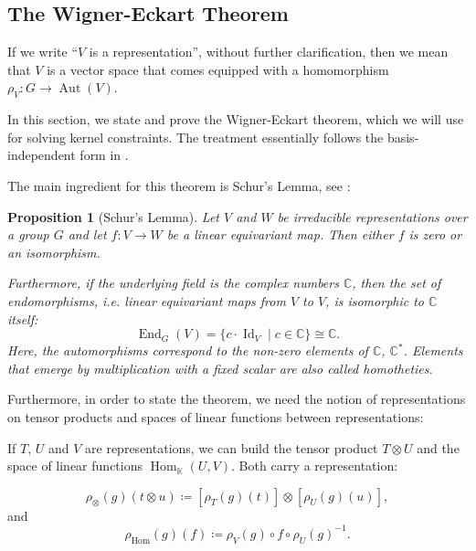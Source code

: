 \documentclass[12pt, a4paper]{article}
\theoremstyle{plain}
\newtheorem{pro}{Proposition}[section]
\theoremstyle{definition}
\theoremstyle{remark}
\newcommand{\C}{\mathds{C}}
\newcommand{\K}{\mathds{K}}
\DeclareMathOperator{\aut}{Aut}
\DeclareMathOperator{\End}{End}
\DeclareMathOperator{\Hom}{Hom}
\DeclareMathOperator{\Id}{Id}
\begin{document}
\subsection{The Wigner-Eckart Theorem}

If we write ``$V$ is a representation'', without further clarification, then we mean that $V$ is a vector space that comes equipped with a homomorphism $\rho_V: G \to \aut (V)$.

In this section, we state and prove the Wigner-Eckart theorem, which we will use for solving kernel constraints. The treatment essentially follows the basis-independent form in \cite{wigner-eckart}.

The main ingredient for this theorem is Schur's Lemma, see \cite{Jeevanjee}:

\begin{pro}[Schur's Lemma]\label{Schur}
Let $V$ and $W$ be irreducible representations over a group $G$ and let $f: V \to W$ be a linear equivariant map. Then either $f$ is zero or an isomorphism.

Furthermore, if the underlying field is the complex numbers $\C$, then the set of endomorphisms, i.e. linear equivariant maps from $V$ to $V$, is isomorphic to $\C$ itself:
\begin{equation*}
\End_{G}(V) = \{c \cdot \Id_V \mid c \in \C\} \cong \C.
\end{equation*}
Here, the automorphisms correspond to the non-zero elements of $\C$, $\C^{*}$. Elements that emerge by multiplication with a fixed scalar are also called \emph{homotheties}.
\end{pro}

Furthermore, in order to state the theorem, we need the notion of representations on tensor products and spaces of linear functions between representations:

If $T$, $U$ and $V$ are representations, we can build the tensor product $T \otimes U$ and the space of linear functions $\Hom_{\K}(U, V)$. Both carry a representation:

\begin{equation*}
\rho_{\otimes}(g)(t \otimes u) \coloneqq \left[\rho_T(g)(t)\right] \otimes \left[\rho_U(g)(u)\right],
\end{equation*}
and
\begin{equation*}
\rho_{\text{Hom}}(g)(f) \coloneq \rho_V(g) \circ f \circ \rho_U(g)^{-1}.
\end{equation*}
\end{document}
